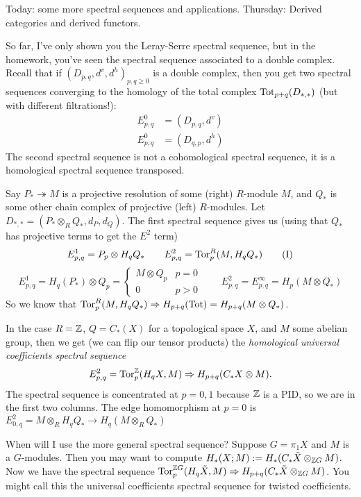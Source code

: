 
Today: some more spectral sequences and applications. Thursday: Derived categories and derived functors.

So far, I've only shown you the Leray-Serre spectral sequence, but in the homework, you've seen the spectral sequence associated to a double complex. Recall that if $(D_{p,q},d^v,d^h)_{p,q\ge 0}$ is a double complex, then you get two spectral sequences converging to the homology of the total complex $\operatorname{Tot}_{p+q}(D_{*,*})$ (but with different filtrations!):
\begin{align*}
 E^0_{p,q}&=(D_{p,q},d^v)\tag{I}\\ 
 E^0_{p,q}&=(D_{q,p},d^h)\tag{II}
\end{align*}
The second spectral sequence is not a cohomological spectral sequence, it is a homological spectral sequence transposed.
\begin{example}
 Say $P_*\twoheadrightarrow M$ is a projective resolution of some (right) $R$-module $M$, and $Q_*$ is some other chain complex of projective (left) $R$-modules. Let $D_{*,*}=(P_*\otimes_R Q_*, d_P,d_Q)$. The first spectral sequence gives us (using that $Q_*$ has projective terms to get the $E^2$ term)
 \[
  E^1_{p,q}= P_p\otimes H_q Q_*\qquad E^2_{p,q}= \operatorname{Tor}_p^R(M,H_q Q_*) 
 \tag{I}\]
 \[
  E^1_{p,q}= H_q(P_*) \otimes Q_p =
  \begin{cases}
   M\otimes Q_p & p=0\\
   0 & p>0
  \end{cases} \qquad E^2_{p,q} = E^\infty_{p,q}= H_p(M\otimes Q_*)
 \tag{II}\]
 So we know that $\operatorname{Tor}^R_p(M,H_q Q_*)\Rightarrow H_{p+q}(\operatorname{Tot}) = H_{p+q}(M\otimes Q_*)$.
\end{example}
In the case $R=\mathbb{Z}$, $Q=C_*(X)$ for a topological space $X$, and $M$ some abelian group, then we get (we can flip our tensor products) the \emph{homological universal coefficients spectral sequence}
\[
 E^2_{p,q}=\operatorname{Tor}_p^{\mathbb{Z}}(H_q X,M)\Rightarrow H_{p+q}(C_* X\otimes M).
\]
The spectral sequence is concentrated at $p=0,1$ because $\mathbb{Z}$ is a PID, so we are in the first two columns. 
The edge homomorphism at $p=0$ is $E^2_{0,q}=M\otimes_R H_qQ_*\to H_q(M\otimes_R Q_*)$

When will I use the more general spectral sequence? Suppose $G=\pi_1 X$ and $M$ is a $G$-modules. Then you may want to compute $H_*(X;M):=H_*(C_*\tilde X\otimes_{\mathbb{Z} G}M)$. Now we have the spectral sequence $\operatorname{Tor}_p^{\mathbb{Z} G}(H_q \tilde X,M)\Rightarrow H_{p+q}(C_*\tilde X\otimes_{\mathbb{Z} G}M)$. You might call this the universal coefficients spectral sequence for twisted coefficients.

